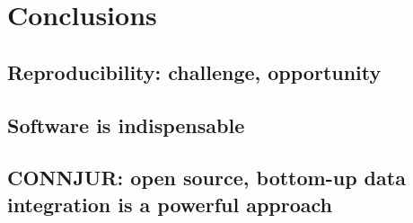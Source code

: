 \chapter{Conclusions}

\section{Reproducibility: challenge, opportunity}

\section{Software is indispensable}

\section{CONNJUR: open source, bottom-up data integration is a powerful approach}

